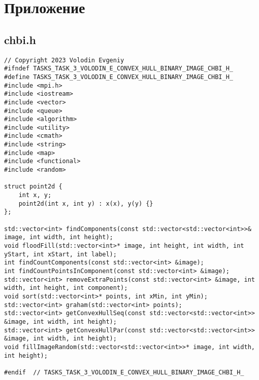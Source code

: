 \section*{Приложение}
\subsection*{chbi.h}
\begin{verbatim}
// Copyright 2023 Volodin Evgeniy
#ifndef TASKS_TASK_3_VOLODIN_E_CONVEX_HULL_BINARY_IMAGE_CHBI_H_
#define TASKS_TASK_3_VOLODIN_E_CONVEX_HULL_BINARY_IMAGE_CHBI_H_
#include <mpi.h>
#include <iostream>
#include <vector>
#include <queue>
#include <algorithm>
#include <utility>
#include <cmath>
#include <string>
#include <map>
#include <functional>
#include <random>

struct point2d {
	int x, y;
	point2d(int x, int y) : x(x), y(y) {}
};

std::vector<int> findComponents(const std::vector<std::vector<int>>& image, int width, int height);
void floodFill(std::vector<int>* image, int height, int width, int yStart, int xStart, int label);
int findCountComponents(const std::vector<int> &image);
int findCountPointsInComponent(const std::vector<int> &image);
std::vector<int> removeExtraPoints(const std::vector<int> &image, int width, int height, int component);
void sort(std::vector<int>* points, int xMin, int yMin);
std::vector<int> graham(std::vector<int> points);
std::vector<int> getConvexHullSeq(const std::vector<std::vector<int>> &image, int width, int height);
std::vector<int> getConvexHullPar(const std::vector<std::vector<int>> &image, int width, int height);
void fillImageRandom(std::vector<std::vector<int>>* image, int width, int height);

#endif  // TASKS_TASK_3_VOLODIN_E_CONVEX_HULL_BINARY_IMAGE_CHBI_H_
\end{verbatim}

